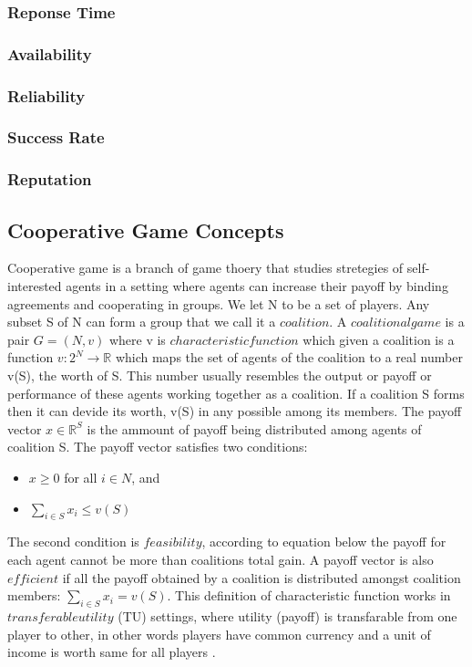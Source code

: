 \documentclass[10pt, conference, compsocconf]{IEEEtran}
\theoremstyle{plain}
\theoremstyle{definition}
\begin{document}
\subsubsection{Reponse Time}
\subsubsection{Availability}
\subsubsection{Reliability}
\subsubsection{Success Rate}
\subsubsection{Reputation}


\subsection{Cooperative Game Concepts}
Cooperative game is a branch of game thoery that studies stretegies of self-interested agents in a setting where agents can increase their payoff by binding agreements and cooperating in groups. We let N to be a set of players. Any subset S of N can form a group that we call it a $coalition$. A $coalitional game$ is a pair $G = (N, v)$ where v is $characteristic function$ which given a coalition is a function $v: 2^N \to \mathbb{R}$ which maps the set of agents of the coalition to a real number v(S), the worth of S. This number usually resembles the output or payoff or performance of these agents working together as a coalition.  If a coalition S forms then it can devide its worth, v(S) in any possible among its members. The payoff vector $x \in \mathbb{R}^S$ is the ammount of payoff being distributed among agents of coalition S. The payoff vector satisfies two conditions: 

\begin{itemize}
	\item $x \geq 0$ for all $i \in N$, and
	\item $\sum_{i \in S} x_i \leq v(S)$
\end{itemize}

The second condition is $feasibility$, according to equation below the payoff for each agent cannot be more than coalitions total gain. A payoff vector is also $efficient$ if all the payoff obtained by a coalition is distributed amongst coalition members: $\sum_{i \in S} x_i = v(S)$. This definition of characteristic function works in $transferable utility$ (TU) settings, where utility (payoff) is transfarable from one player to other, in other words players have common currency and a unit of income is worth same for all players \cite{myerson1991game}.
\end{document}
